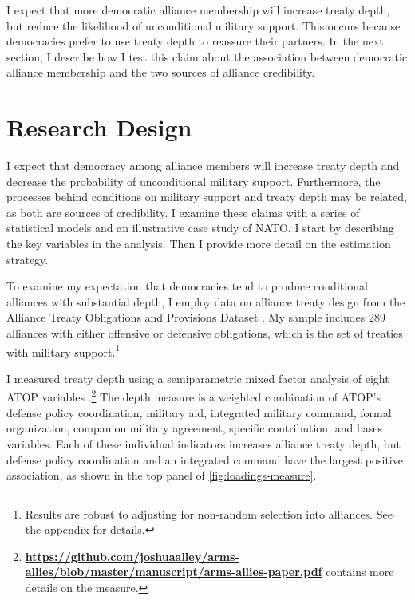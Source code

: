 \documentclass[12pt]{article}
\begin{document}
I expect that more democratic alliance membership will increase treaty depth, but reduce the likelihood of unconditional military support.  
This occurs because democracies prefer to use treaty depth to reassure their partners. 
In the next section, I describe how I test this claim about the association between democratic alliance membership and the two sources of alliance credibility. 



\section{Research Design}

 
I expect that democracy among alliance members will increase treaty depth and decrease the probability of unconditional military support. 
Furthermore, the processes behind conditions on military support and treaty depth may be related, as both are sources of credibility. 
I examine these claims with a series of statistical models and an illustrative case study of NATO. 
I start by describing the key variables in the analysis. 
Then I provide more detail on the estimation strategy. 


To examine my expectation that democracies tend to produce conditional alliances with substantial depth, I employ data on alliance treaty design from the Alliance Treaty Obligations and Provisions Dataset \citep{Leedsetal2002}. 
My sample includes 289 alliances with either offensive or defensive obligations, which is the set of treaties with military support.\footnote{Results are robust to adjusting for non-random selection into alliances. See the appendix for details.} 


I measured treaty depth using a semiparametric mixed factor analysis of eight ATOP variables \citep{Murrayetal2013}.\footnote{\textbf{\url{https://github.com/joshuaalley/arms-allies/blob/master/manuscript/arms-allies-paper.pdf}} contains more details on the measure.}
The depth measure is a weighted combination of ATOP's defense policy coordination, military aid, integrated military command, formal organization, companion military agreement, specific contribution, and bases variables. 
Each of these individual indicators increases alliance treaty depth, but defense policy coordination and an integrated command have the largest positive association, as shown in the top panel of \autoref{fig:loadings-measure}. 
\end{document}
